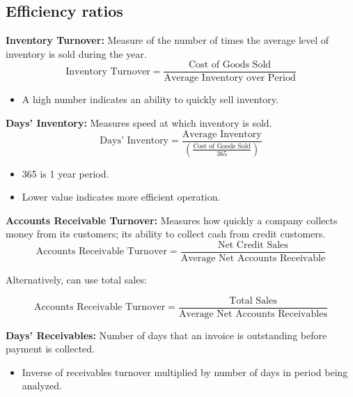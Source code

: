 \subsection{Efficiency ratios}
\begin{definition}

    \textbf{Inventory Turnover:} Measure of the number of times the average level of inventory is sold during the year.
    \begin{equation}
        \text{Inventory Turnover} = \frac{\text{Cost of Goods Sold}}{\text{Average Inventory over Period}}
    \end{equation}
    \begin{itemize}
        \item A high number indicates an ability to quickly sell inventory.
    \end{itemize}
    \vspace{1em}

    \textbf{Days' Inventory:} Measures speed at which inventory is sold.
    \begin{equation}
        \text{Days' Inventory} = \frac{\text{Average Inventory}}{\left(\frac{\text{Cost of Goods Sold}}{365}\right)}
    \end{equation}
    \begin{itemize}
        \item 365 is 1 year period.
        \item Lower value indicates more efficient operation.
    \end{itemize}
    \vspace{1em}

    \textbf{Accounts Receivable Turnover:} Measures how quickly a company collects money from its customers; its ability to collect cash from credit customers.
    \begin{equation}
        \text{Accounts Receivable Turnover} = \frac{\text{Net Credit Sales}}{\text{Average Net Accounts Receivable}}
    \end{equation}
    
    Alternatively, can use total sales:

    \begin{equation}
        \text{Accounts Receivable Turnover} = \frac{\text{Total Sales}}{\text{Average Net Accounts Receivables}}
    \end{equation}
    \vspace{1em}

    \textbf{Days' Receivables:} Number of days that an invoice is outstanding before payment is collected.
    \begin{itemize}
        \item Inverse of receivables turnover multiplied by number of days in period being analyzed.
    \end{itemize}


\end{definition}
